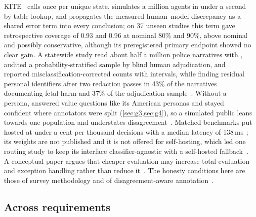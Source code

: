 KITE~\cite{arx27535} calls \jev{} once per unique state, simulates a million agents in under a second by table lookup, and propagates the measured human--model discrepancy as a shared error term into every conclusion; on 37 unseen studies this term gave retrospective coverage of 0.93 and 0.96 at nominal 80\% and 90\%, above nominal and possibly conservative, although its preregistered primary endpoint showed no clear gain.
A statewide study read about half a million police narratives with \jev{}, audited a probability-stratified sample by blind human adjudication, and reported misclassification-corrected counts with intervals, while finding residual personal identifiers after two redaction passes in 43\% of the narratives documenting fetal harm and 37\% of the adjudication sample~\cite{arx00213}.
Without a persona, \jev{} answered value questions like its American personas and stayed confident where annotators were split (\cref{sec:g3,sec:g4}), so a simulated public leans towards one population and understates disagreement~\cite{arx36399,zen23032384}\zmark{}.
Matched benchmarks put hosted \jev{} at under a cent per thousand decisions with a median latency of 138\,ms~\cite{arx00346}; its weights are not published and it is not offered for self-hosting, which led one routing study to keep its interface classifier-agnostic with a self-hosted fallback~\cite{arx28919}.
A conceptual paper argues that cheaper evaluation may increase total evaluation and exception handling rather than reduce it~\cite{arx01231}.
The honesty conditions here are those of survey methodology and of disagreement-aware annotation~\cite{davani2022dealing,plank2022problem}.

\subsection{Across requirements}
\label{sec:across}

